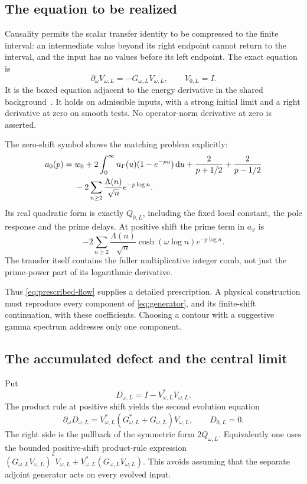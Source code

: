 \subsection{The equation to be realized}

Causality permits the scalar transfer identity to be compressed to
the finite interval: an intermediate value beyond its right endpoint
cannot return to the interval, and the input has no values before
its left endpoint. The exact equation is
\begin{equation}\label{eq:prescribed-flow}
 \boxed{\partial_\omega V_{\omega,L}
       =-G_{\omega,L}V_{\omega,L},\qquad V_{0,L}=I.}
\end{equation}
It is the boxed equation adjacent to the energy derivative in the
shared background~\cite{SharedBackground}. It holds on admissible
inputs, with a strong initial limit and a right derivative at zero
on smooth tests. No operator-norm derivative at zero is asserted.

The zero-shift symbol shows the matching problem explicitly:
\begin{align}\label{eq:generator}
 a_0(p)={}&w_0+
 2\int_0^\infty n_\Gamma(u)(1-e^{-pu})\,\mathrm d u
 +\frac2{p+1/2}+\frac2{p-1/2}\notag\\
 &-2\sum_{n\geq2}\frac{\Lambda(n)}{\sqrt n}e^{-p\log n}.
\end{align}
Its real quadratic form is exactly $Q_{0,L}$, including the fixed
local constant, the pole response and the prime delays.
At positive shift the prime term in $a_\omega$ is
\[
 -2\sum_{n\geq2}\frac{\Lambda(n)}{\sqrt n}
       \cosh(\omega\log n)e^{-p\log n}.
\]
The transfer itself contains the fuller multiplicative integer comb,
not just the prime-power part of its logarithmic derivative.

Thus \eqref{eq:prescribed-flow} supplies a detailed prescription.
A physical construction must reproduce every component of
\eqref{eq:generator}, and its finite-shift continuation, with these
coefficients. Choosing a contour with a suggestive gamma spectrum
addresses only one component.

\subsection{The accumulated defect and the central limit}

Put
\begin{equation}\label{eq:defect}
 D_{\omega,L}=I-V_{\omega,L}^*V_{\omega,L}.
\end{equation}
The product rule at positive shift yields the second evolution
equation
\begin{equation}\label{eq:defect-flow}
 \boxed{\partial_\omega D_{\omega,L}
 =V_{\omega,L}^*(G_{\omega,L}^*+G_{\omega,L})V_{\omega,L},
 \qquad D_{0,L}=0.}
\end{equation}
The right side is the pullback of the symmetric form $2Q_{\omega,L}$.
Equivalently one uses the bounded positive-shift product-rule
expression
$(G_{\omega,L}V_{\omega,L})^*V_{\omega,L}
+V_{\omega,L}^*(G_{\omega,L}V_{\omega,L})$.
This avoids assuming that the separate adjoint generator acts
on every evolved input.

